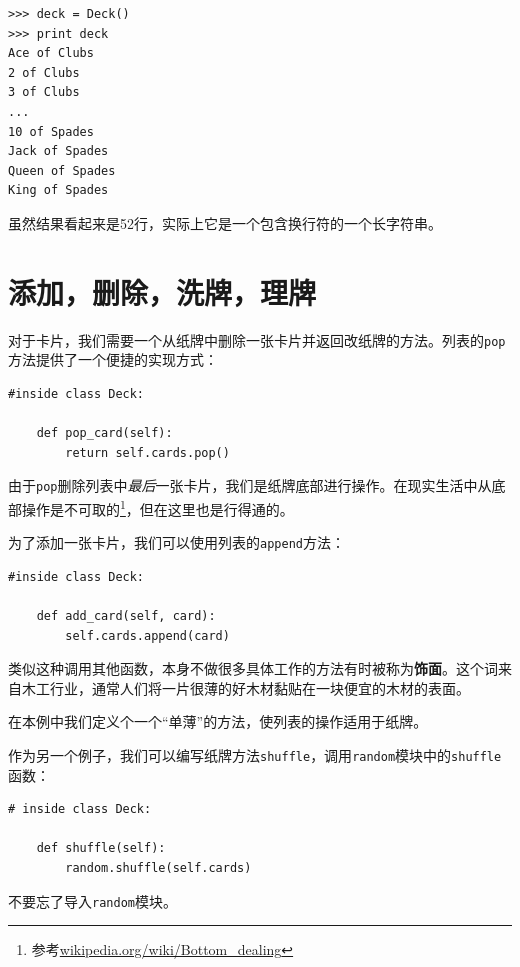 \beforeverb
\begin{verbatim}
>>> deck = Deck()
>>> print deck
Ace of Clubs
2 of Clubs
3 of Clubs
...
10 of Spades
Jack of Spades
Queen of Spades
King of Spades
\end{verbatim}
\afterverb
%
虽然结果看起来是52行，实际上它是一个包含换行符的一个长字符串。


\section{添加，删除，洗牌，理牌}

对于卡片，我们需要一个从纸牌中删除一张卡片并返回改纸牌的方法。列表的{\tt pop}方法提供了一个便捷的实现方式：


\beforeverb
\begin{verbatim}
#inside class Deck:

    def pop_card(self):
        return self.cards.pop()
\end{verbatim}
\afterverb
%
由于{\tt pop}删除列表中{\em 最后}一张卡片，我们是纸牌底部进行操作。在现实生活中从底部操作是不可取的\footnote{参考\url{wikipedia.org/wiki/Bottom_dealing}}，但在这里也是行得通的。


为了添加一张卡片，我们可以使用列表的{\tt append}方法：

\beforeverb
\begin{verbatim}
#inside class Deck:

    def add_card(self, card):
        self.cards.append(card)
\end{verbatim}
\afterverb
%
类似这种调用其他函数，本身不做很多具体工作的方法有时被称为{\bf 饰面}。这个词来自木工行业，通常人们将一片很薄的好木材黏贴在一块便宜的木材的表面。


在本例中我们定义个一个“单薄”的方法，使列表的操作适用于纸牌。

作为另一个例子，我们可以编写纸牌方法{\tt shuffle}，调用{\tt random}模块中的{\tt shuffle}函数： 


\beforeverb
\begin{verbatim}
# inside class Deck:
            
    def shuffle(self):
        random.shuffle(self.cards)
\end{verbatim}
\afterverb
%
不要忘了导入{\tt random}模块。

